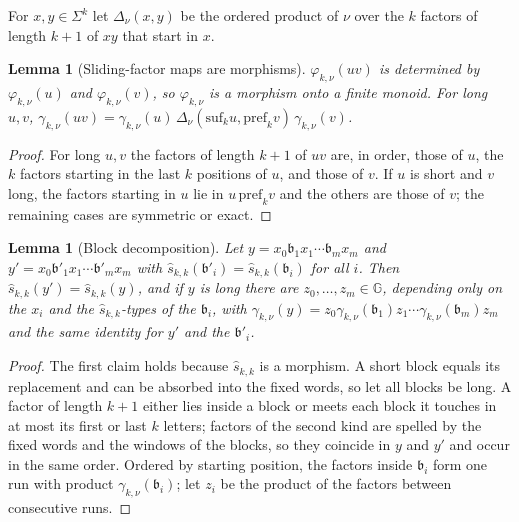\documentclass[11pt]{article}
\numberwithin{equation}{section}
\theoremstyle{plain}
\newtheorem{lemma}[theorem]{Lemma}
\theoremstyle{definition}
\theoremstyle{remark}
\theoremstyle{plain}
\begin{document}
For $x,y\in\Sigma^k$ let $\Delta_\nu(x,y)$ be the ordered product of $\nu$ over the
$k$ factors of length $k+1$ of $xy$ that start in $x$.

\begin{lemma}[Sliding-factor maps are morphisms]
\label{lem:sliding-morphism}
$\varphi_{k,\nu}(uv)$ is determined by $\varphi_{k,\nu}(u)$ and $\varphi_{k,\nu}(v)$, so
$\varphi_{k,\nu}$ is a morphism onto a finite monoid.  For long $u,v$,
$\gamma_{k,\nu}(uv)=\gamma_{k,\nu}(u)\,\Delta_\nu(\mathrm{suf}_ku,\mathrm{pref}_kv)\,\gamma_{k,\nu}(v)$.
\end{lemma}

\begin{proof}
For long $u,v$ the factors of length $k+1$ of $uv$ are, in order, those of $u$,
the $k$ factors starting in the last $k$ positions of $u$, and those of $v$.  If
$u$ is short and $v$ long, the factors starting in $u$ lie in $u\,\mathrm{pref}_kv$
and the others are those of $v$; the remaining cases are symmetric or exact.
\end{proof}

\begin{lemma}[Block decomposition]
\label{lem:blocks}
Let $y=x_0\mathfrak b_1x_1\cdots\mathfrak b_mx_m$ and
$y'=x_0\mathfrak b'_1x_1\cdots\mathfrak b'_mx_m$ with
$\widehat s_{k,k}(\mathfrak b'_i)=\widehat s_{k,k}(\mathfrak b_i)$ for all $i$.  Then
$\widehat s_{k,k}(y')=\widehat s_{k,k}(y)$, and if $y$ is long there are
$z_0,\ldots,z_m\in\mathbb G$, depending only on the $x_i$ and the
$\widehat s_{k,k}$-types of the $\mathfrak b_i$, with
$\gamma_{k,\nu}(y)=z_0\gamma_{k,\nu}(\mathfrak b_1)z_1\cdots\gamma_{k,\nu}(\mathfrak b_m)z_m$ and
the same identity for $y'$ and the $\mathfrak b'_i$.
\end{lemma}

\begin{proof}
The first claim holds because $\widehat s_{k,k}$ is a morphism.  A short block
equals its replacement and can be absorbed into the fixed words, so let all
blocks be long.  A factor of length $k+1$ either lies inside a block or meets
each block it touches in at most its first or last $k$ letters; factors of the
second kind are spelled by the fixed words and the windows of the blocks, so
they coincide in $y$ and $y'$ and occur in the same order.  Ordered by starting
position, the factors inside $\mathfrak b_i$ form one run with product
$\gamma_{k,\nu}(\mathfrak b_i)$; let $z_i$ be the product of the factors between
consecutive runs.
\end{proof}
\end{document}

